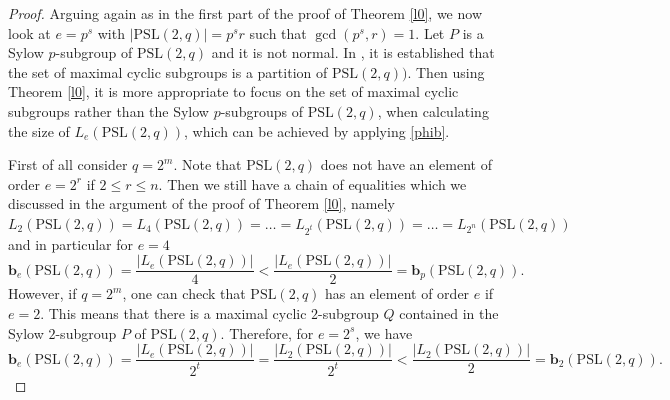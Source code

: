 \documentclass{amsart}
\theoremstyle{definition}
\numberwithin{equation}{section}
\begin{document}
\begin{proof}
Arguing again as in the first part of the proof of Theorem \ref{l0}, we now look at  $e=p^s$ with $|\mathrm{PSL}(2,q)|=p^sr$ such that $\gcd(p^s,r)=1$. Let $P$ is a Sylow $p$-subgroup of $\mathrm{PSL}(2,q)$ and it is not normal. In \cite [Example 3.5.1]{rs}, it is established that the set of maximal cyclic subgroups is a partition of $\mathrm{PSL}(2,q))$. Then using Theorem \ref{l0}, it is more appropriate to focus on the set of maximal cyclic subgroups rather than the Sylow $p$-subgroups of $\mathrm{PSL}(2,q)$, when calculating the size of $ L_e(\mathrm{PSL}(2,q))$, which can be achieved by applying \eqref{phib}.


First of all consider $q=2^m$.  Note that $\mathrm{PSL}(2,q)$ does not have an element of order $e=2^r$ if $2\le r \leq n$. Then we still have a chain of equalities which we discussed in the argument of the proof of Theorem \ref{l0}, namely
$L_2(\mathrm{PSL}(2,q))=L_{4}(\mathrm{PSL}(2,q))= \ldots = L_{2^t}(\mathrm{PSL}(2,q))= \ldots= L_{2^n}(\mathrm{PSL}(2,q))$ and in particular for $e=4$ 
\begin{equation}
\mathbf{b}_e(\mathrm{PSL}(2,q))=\frac{|L_e(\mathrm{PSL}(2,q))|}{4} < \frac{|L_e(\mathrm{PSL}(2,q))|}{2}=\mathbf{b}_{p}(\mathrm{PSL}(2,q)).
\end{equation}
However, if $q=2^m$, one can check that $\mathrm{PSL}(2,q)$ has an element of order $e$ if $e=2$. This means that there is a maximal cyclic $2$-subgroup  $Q$ contained in the Sylow $2$-subgroup $P$ of $\mathrm{PSL}(2,q)$.  Therefore, for $e=2^s$,   we have
\begin{equation}
\mathbf{b}_e(\mathrm{PSL}(2,q))=\frac{|L_e(\mathrm{PSL}(2,q))|}{2^t}=\frac{|L_2(\mathrm{PSL}(2,q))|}{2^t} < \frac{|L_2(\mathrm{PSL}(2,q))|}{2}=\mathbf{b}_{2}(\mathrm{PSL}(2,q)).
\end{equation}


\end{proof}
\end{document}

